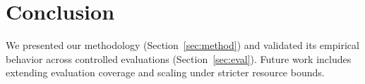 \section{Conclusion}
\label{sec:conclusion}


We presented our methodology (Section~\ref{sec:method}) and validated its empirical behavior across controlled evaluations (Section~\ref{sec:eval}). Future work includes extending evaluation coverage and scaling under stricter resource bounds.

